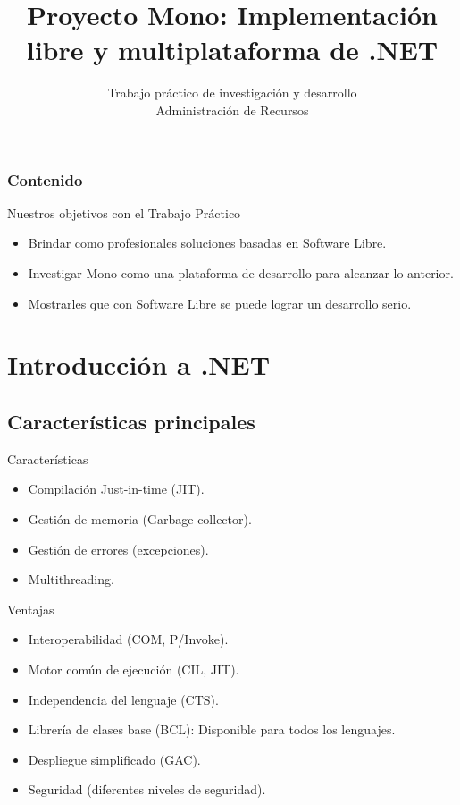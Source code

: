 \documentclass{beamer}
\title[Proyecto Mono]
{Proyecto Mono: Implementación libre y multiplataforma de .NET}
\date[TP Adm. de Recursos]
{Trabajo práctico de investigación y desarrollo \\ Administración de Recursos}
\begin{document}
\begin{frame}
  \titlepage
\end{frame}

\begin{frame}
  \frametitle{Contenido}
  \begin{scriptsize}
  \tableofcontents
  \end{scriptsize}
\end{frame}

\begin{frame}{Nuestros objetivos con el Trabajo Práctico}
  \begin{itemize}
    \item Brindar como profesionales soluciones basadas en Software Libre.
    \item Investigar Mono como una plataforma de desarrollo para alcanzar lo anterior.
    \item Mostrarles que con Software Libre se puede lograr un desarrollo serio.
  \end{itemize}
\end{frame}


\section{Introducción a .NET}

\subsection{Características principales}

\begin{frame}{Características}
  \begin{itemize}
    \item Compilación Just-in-time (JIT).
    \item Gestión de memoria (Garbage collector).
    \item Gestión de errores (excepciones).
    \item Multithreading.
  \end{itemize}
\end{frame}

\begin{frame}{Ventajas}
  \begin{itemize}
    \item Interoperabilidad (COM, P/Invoke).
    \item Motor común de ejecución (CIL, JIT).
    \item Independencia del lenguaje (CTS).
    \item Librería de clases base (BCL): Disponible para todos los lenguajes.
    \item Despliegue simplificado (GAC).
    \item Seguridad (diferentes niveles de seguridad).
  \end{itemize}
\end{frame}
\end{document}
